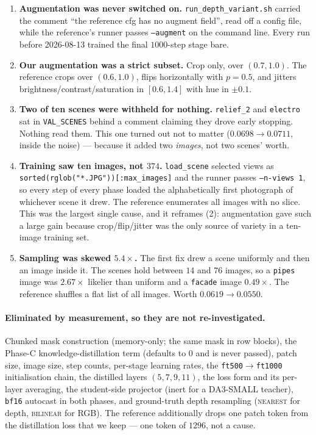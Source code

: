 \documentclass[11pt,a4paper]{article}
\begin{document}
\begin{enumerate}
  \item \textbf{Augmentation was never switched on.} \texttt{run\_depth\_variant.sh} carried the
    comment ``the reference cfg has no augment field'', read off a config file, while the
    reference's runner passes \texttt{--augment} on the command line. Every run before 2026-08-13
    trained the final $1000$-step stage bare.
  \item \textbf{Our augmentation was a strict subset.} Crop only, over $(0.7, 1.0)$. The reference
    crops over $(0.6, 1.0)$, flips horizontally with $p=0.5$, and jitters
    brightness/contrast/saturation in $[0.6, 1.4]$ with hue in $\pm0.1$.
  \item \textbf{Two of ten scenes were withheld for nothing.} \texttt{relief\_2} and
    \texttt{electro} sat in \texttt{VAL\_SCENES} behind a comment claiming they drove early
    stopping. Nothing read them. This one turned out not to matter ($0.0698 \to 0.0711$, inside
    the noise) --- because it added two \emph{images}, not two scenes' worth.
  \item \textbf{Training saw ten images, not $374$.} \texttt{load\_scene} selected views as
    \texttt{sorted(rglob("*.JPG"))[:max\_images]} and the runner passes \texttt{--n-views 1}, so
    every step of every phase loaded the alphabetically first photograph of whichever scene it
    drew. The reference enumerates all images with no slice. This was the largest single cause,
    and it reframes (2): augmentation gave such a large gain because crop/flip/jitter was the only
    source of variety in a ten-image training set.
  \item \textbf{Sampling was skewed $5.4\times$.} The first fix drew a scene uniformly and then an
    image inside it. The scenes hold between $14$ and $76$ images, so a \texttt{pipes} image was
    $2.67\times$ likelier than uniform and a \texttt{facade} image $0.49\times$. The reference
    shuffles a flat list of all images. Worth $0.0619 \to 0.0550$.
\end{enumerate}

\paragraph{Eliminated by measurement, so they are not re-investigated.} Chunked mask construction
(memory-only; the same mask in row blocks), the Phase-C knowledge-distillation term (defaults to
$0$ and is never passed), patch size, image size, step counts, per-stage learning rates, the
\texttt{ft500}$\to$\texttt{ft1000} initialisation chain, the distilled layers $(5,7,9,11)$, the
loss form and its per-layer averaging, the student-side projector (inert for a DA3-SMALL teacher),
\texttt{bf16} autocast in both phases, and ground-truth depth resampling (\textsc{nearest} for
depth, \textsc{bilinear} for RGB). The reference additionally drops one patch token from the
distillation loss that we keep --- one token of $1296$, not a cause.
\end{document}

